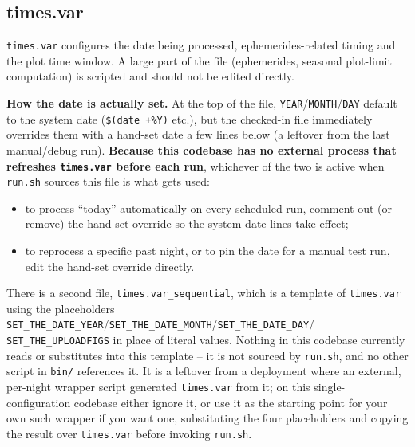 \subsection{times.var}
\texttt{times.var} configures the date being processed, ephemerides-related timing and the plot time
window. A large part of the file (ephemerides, seasonal plot-limit computation) is scripted and should
not be edited directly.

\textbf{How the date is actually set.} At the top of the file, \texttt{YEAR}/\texttt{MONTH}/\texttt{DAY}
default to the system date (\texttt{\$(date +\%Y)} etc.), but the checked-in file immediately overrides
them with a hand-set date a few lines below (a leftover from the last manual/debug run). \textbf{Because
this codebase has no external process that refreshes \texttt{times.var} before each run}, whichever of
the two is active when \texttt{run.sh} sources this file is what gets used:
\begin{itemize}
  \item to process ``today'' automatically on every scheduled run, comment out (or remove) the
        hand-set override so the system-date lines take effect;
  \item to reprocess a specific past night, or to pin the date for a manual test run, edit the
        hand-set override directly.
\end{itemize}
There is a second file, \texttt{times.var\_sequential}, which is a template of \texttt{times.var} using
the placeholders \texttt{SET\_THE\_DATE\_YEAR}/\texttt{SET\_THE\_DATE\_MONTH}/\texttt{SET\_THE\_DATE\_DAY}/
\texttt{SET\_THE\_UPLOADFIGS} in place of literal values. Nothing in this codebase currently reads or
substitutes into this template -- it is not sourced by \texttt{run.sh}, and no other script in
\texttt{bin/} references it. It is a leftover from a deployment where an external, per-night wrapper
script generated \texttt{times.var} from it; on this single-configuration codebase either ignore it, or
use it as the starting point for your own such wrapper if you want one, substituting the four
placeholders and copying the result over \texttt{times.var} before invoking \texttt{run.sh}.

